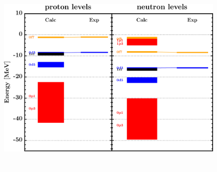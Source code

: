 \documentclass[twocolumn,secnumarabic,amssymb, nobibnotes, aps, prl,
superscriptaddress, nobalancelastpage, draft]{revtex4}
\begin{document}
\begin{figure}[!htb]
\begin{minipage}{0.4\linewidth}
        \label{DOM_ca40_chargeDensity}
    \end{minipage}
    \begin{minipage}{0.35\linewidth}
        \centering
        \includegraphics[width=\linewidth]{figures/ca40_SPLevels.png}
        \label{DOM_ca40_SPLevels}
    \end{minipage}
    \begin{minipage}{0.4\linewidth}
        \centering
        \includegraphics[width=\linewidth]{figures/ca40_RMSRadius.png}

\end{minipage}
\end{figure}
\end{document}
